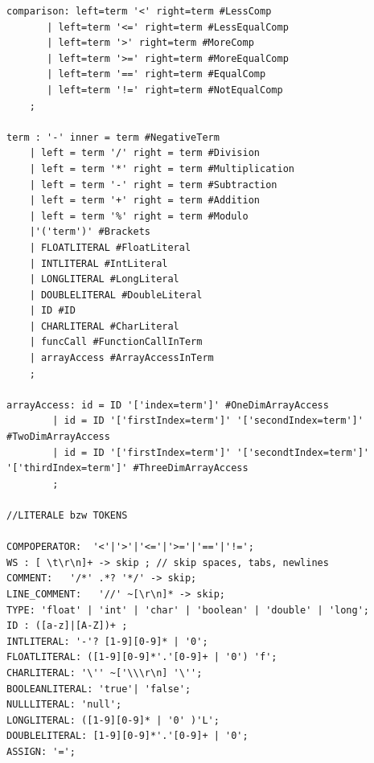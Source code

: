 \documentclass[parskip=full]{scrartcl}
\begin{document}
\begin{verbatim}
comparison: left=term '<' right=term #LessComp
	   | left=term '<=' right=term #LessEqualComp
	   | left=term '>' right=term #MoreComp
	   | left=term '>=' right=term #MoreEqualComp
	   | left=term '==' right=term #EqualComp
	   | left=term '!=' right=term #NotEqualComp
	;

term : '-' inner = term #NegativeTerm
    | left = term '/' right = term #Division
	| left = term '*' right = term #Multiplication
	| left = term '-' right = term #Subtraction
	| left = term '+' right = term #Addition
	| left = term '%' right = term #Modulo
	|'('term')' #Brackets
	| FLOATLITERAL #FloatLiteral
	| INTLITERAL #IntLiteral
	| LONGLITERAL #LongLiteral
	| DOUBLELITERAL #DoubleLiteral
	| ID #ID
	| CHARLITERAL #CharLiteral
	| funcCall #FunctionCallInTerm
	| arrayAccess #ArrayAccessInTerm
	;

arrayAccess: id = ID '['index=term']' #OneDimArrayAccess
		| id = ID '['firstIndex=term']' '['secondIndex=term']' #TwoDimArrayAccess
		| id = ID '['firstIndex=term']' '['secondtIndex=term']' '['thirdIndex=term']' #ThreeDimArrayAccess
		;

//LITERALE bzw TOKENS

COMPOPERATOR:  '<'|'>'|'<='|'>='|'=='|'!=';
WS : [ \t\r\n]+ -> skip ; // skip spaces, tabs, newlines
COMMENT:   '/*' .*? '*/' -> skip;
LINE_COMMENT:   '//' ~[\r\n]* -> skip;
TYPE: 'float' | 'int' | 'char' | 'boolean' | 'double' | 'long';
ID : ([a-z]|[A-Z])+ ;
INTLITERAL: '-'? [1-9][0-9]* | '0';
FLOATLITERAL: ([1-9][0-9]*'.'[0-9]+ | '0') 'f';
CHARLITERAL: '\'' ~['\\\r\n] '\'';
BOOLEANLITERAL:	'true'|	'false';
NULLLITERAL: 'null';
LONGLITERAL: ([1-9][0-9]* | '0' )'L';
DOUBLELITERAL: [1-9][0-9]*'.'[0-9]+ | '0';
ASSIGN: '=';
\end{verbatim}
\end{document}

